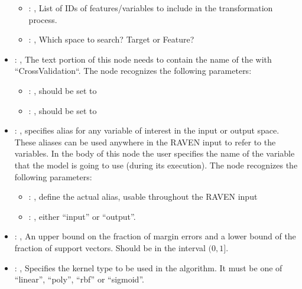 \begin{itemize}
\begin{itemize}
        \item {}: , 
          List of IDs of features/variables to include in the transformation process.

        \item {}: , 
          Which space to search? Target or Feature?
      \end{itemize}

    \item {}: , 
      The text portion of this node needs to contain the name of the  with
               ``CrossValidation``.
      The  node recognizes the following parameters:
        \begin{itemize}
          \item {}: , 
            should be set to 
          \item {}: , 
            should be set to 
      \end{itemize}

    \item {}: , 
      specifies alias for         any variable of interest in the input or output space. These
      aliases can be used anywhere in the RAVEN input to         refer to the variables. In the body
      of this node the user specifies the name of the variable that the model is going to use
      (during its execution).
      The  node recognizes the following parameters:
        \begin{itemize}
          \item {}: , 
            define the actual alias, usable throughout the RAVEN input
          \item {}: , 
            either ``input'' or ``output''.
      \end{itemize}

    \item {}: , 
      An upper bound on the fraction of margin errors and
      a lower bound of the fraction of support vectors. Should be in the interval $(0, 1]$.

    \item {}: , 
      Specifies the kernel type to be used in the algorithm. It must be one of
      ``linear'', ``poly'', ``rbf'' or ``sigmoid''.


\end{itemize}

